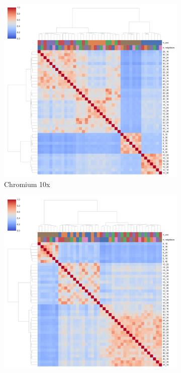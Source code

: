 \documentclass[11pt, titlepage, twoside]{article}
\begin{document}
\clearpage
\begin{figure}[H]
\centering
    \begin{subfigure}[t]{0.3\textwidth}
        \centering
        \includegraphics[width=\textwidth]{ClusterMap_L0_Panel0.pdf} 
        \caption{Chromium 10x} \label{cm_10x}
    \end{subfigure}
    \hfill
    \begin{subfigure}[t]{0.3\textwidth}
        \centering
        \includegraphics[width=\textwidth]{ClusterMap_L0_Panel1.pdf} 

\end{subfigure}
\end{figure}
\end{document}

